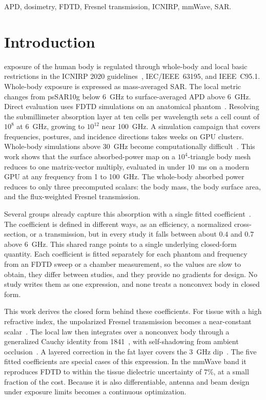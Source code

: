 \documentclass[journal,twocolumn,10pt]{IEEEtran}
\begin{document}
\begin{IEEEkeywords}
APD, dosimetry, FDTD, Fresnel transmission, ICNIRP, mmWave, SAR.
\end{IEEEkeywords}

\IEEEpeerreviewmaketitle

\section{Introduction}\label{sec:introduction}

 exposure of the human body is regulated
through whole-body and local basic restrictions in the \gls{ICNIRP} 2020
guidelines~\cite{ICNIRP2020}, IEC/IEEE~63195, and IEEE~C95.1. Whole-body
exposure is expressed as mass-averaged \gls{SAR}. The local metric changes
from \gls{psSAR10g} below 6~GHz to surface-averaged \gls{APD} above 6~GHz. Direct evaluation uses
\gls{FDTD} simulations on an anatomical
phantom~\cite{Kodera2024,Diao2024,Hirata2021,Wydaeghe2026}. Resolving the submillimeter
absorption layer at ten cells per wavelength
sets a cell count of $10^{8}$ at 6~GHz, growing to $10^{12}$ near
100~GHz. A simulation campaign that covers frequencies, postures, and
incidence directions takes weeks on \gls{GPU} clusters. Whole-body
simulations above 30~GHz become computationally difficult~\cite{Wydaeghe2026}.
This work shows that the surface absorbed-power map on a
$10^4$-triangle body mesh reduces to one matrix-vector multiply,
evaluated in under $10$~ms on a modern GPU at any
frequency from 1 to 100~GHz. The whole-body absorbed power
reduces to only three precomputed scalars: the body mass, the
body surface area, and the flux-weighted Fresnel transmission.

Several groups already capture this absorption with a single fitted
coefficient~\cite{Bamba2014,Flintoft2014,Zhang2017thesis,ZhangRobinson2020,Kodera2024,Diao2024}.
The coefficient is defined in different ways, as an efficiency, a
normalized cross-section, or a transmission, but in every study it
falls between about $0.4$ and $0.7$ above $6$~GHz. This shared range
points to a single underlying closed-form quantity. Each coefficient
is fitted separately for each phantom and frequency from an \gls{FDTD}
sweep or a chamber measurement, so the values are slow to obtain, they
differ between studies, and they provide no gradients for design. No
study writes them as one expression, and none treats a nonconvex body
in closed form.

This work derives the closed form behind these coefficients. For tissue with a
high refractive index, the unpolarized Fresnel transmission becomes a
near-constant scalar~\cite{Azzam2015}. The local law then integrates
over a nonconvex body through a generalized Cauchy identity
from 1841~\cite{Cauchy1841}, with self-shadowing from ambient
occlusion~\cite{Zhukov1998,Landis2002,AkenineMoller2018}. A layered
correction in the fat layer covers the $3$~GHz dip~\cite{Flintoft2014}.
The five fitted coefficients are special cases of this expression. In
the mmWave band it reproduces \gls{FDTD} to within the tissue
dielectric uncertainty of $7\%$, at a small fraction of the cost. Because it is
also differentiable, antenna and beam design under exposure limits
becomes a continuous optimization.
\end{document}
